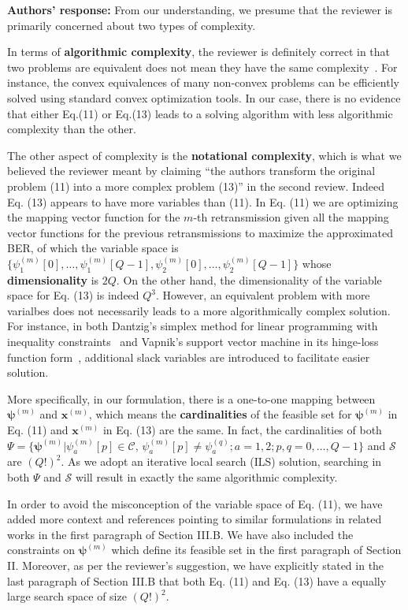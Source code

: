 \documentclass[onecolumn, 11pt, draftclsnofoot]{IEEEtran}
\begin{document}
\noindent \textbf{Authors' response:}
From our understanding, we presume that the reviewer is primarily concerned
about two types of complexity.

In terms of \textbf{algorithmic complexity}, the reviewer is definitely correct
in that two problems are equivalent does not mean they have the same
complexity~\citep[R][Sec. 4.1.3]{boyd2004convex}. For instance, the convex
equivalences of many non-convex problems can be efficiently solved using
standard convex optimization tools. In our case, there is no
evidence that either Eq.(11) or Eq.(13) leads to a solving algorithm with less
algorithmic complexity than the other.

The other aspect of complexity is the \textbf{notational complexity}, which is
what we believed the reviewer meant by claiming ``the authors transform the
original problem (11) into a more complex problem (13)'' in the second review.
Indeed Eq. (13) appears to have more variables than (11). In Eq. (11) we are
optimizing the mapping vector function for the $m$-th retransmission given all the mapping
vector functions for the previous retransmissions to maximize the approximated
BER, of which the variable space is $\{\psi_1^{(m)}[0], \ldots,
\psi_1^{(m)}[Q-1], \psi_2^{(m)}[0], \ldots, \psi_2^{(m)}[Q-1]\}$ whose
\textbf{dimensionality} is $2Q$. On the other hand, the dimensionality of the
variable space for Eq. (13) is indeed $Q^3$. However, an equivalent problem with
more varialbes does not necessarily leads to a more algorithmically complex
solution. For instance, in both Dantzig's simplex method for linear
programming with inequality constraints~\citep[R][]{gass1958linear} and Vapnik's
support vector machine in its hinge-loss function form~\citep[R][Eq.
(12.25)]{friedman2001elements}, additional slack variables are introduced to
facilitate easier solution.
  
More specifically, in our formulation, there is a
one-to-one mapping between $\bm{\psi}^{(m)}$ and $\mathbf{x}^{(m)}$, which
means the \textbf{cardinalities} of the feasible set for $\bm{\psi}^{(m)}$ in
Eq. (11) and $\mathbf{x}^{(m)}$ in Eq. (13) are the same. In fact, the
cardinalities of both $\Psi = \{\bm{\psi}^{(m)}| \psi_a^{(m)}[p]\in
\mathcal{C},\, \psi_a^{(m)}[p] \not= \psi_a^{(q)}; a=1,2; p,q =
0,\ldots,Q-1\}$ and $\mathcal{S}$ are $(Q!)^2$. As we adopt an iterative local
search (ILS) solution, searching in both $\Psi$ and $\mathcal{S}$ will result
in exactly the same algorithmic complexity.

In order to avoid the misconception of the variable space of Eq. (11), we have
added more context and references pointing to similar formulations in related
works in the first paragraph of Section III.B. We have also included the
constraints on $\bm{\psi}^{(m)}$ which define its feasible set in the first
paragraph of Section II. Moreover, as per the reviewer's suggestion, we have
explicitly stated in the last paragraph of Section III.B that both Eq. (11) and
Eq. (13) have a equally large search space of size $(Q!)^2$.
\end{document}
